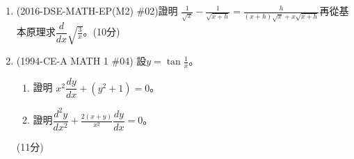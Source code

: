 \documentclass[12pt]{article}
\begin{document}
\begin{enumerate}
            \hrulefill
            
            \hrulefill
            
            \hrulefill

        \pagebreak
        \item (2016-DSE-MATH-EP(M2) \#02)證明 $\displaystyle \frac{1}{\sqrt{x}}-\frac{1}{\sqrt{x+h}}=\frac{h}{(x+h)\sqrt{x}+x\sqrt{x+h}}$再從基本原理求$\displaystyle \dfrac{d}{dx}\sqrt{\frac{3}{x}}$。\hfill(10分)
        
        \hrulefill
            
            \hrulefill
            
            \hrulefill
            
            \hrulefill
            
            \hrulefill
            
            \hrulefill
            
            \hrulefill
            
            \hrulefill
            
            \hrulefill
            
            \hrulefill
            
            \hrulefill
            
            \hrulefill
            
            \hrulefill
            
            \hrulefill

            \hrulefill
            
            \hrulefill
            
            \hrulefill
            
            \hrulefill
            
            \hrulefill
            
            \hrulefill
            
            \hrulefill
            
            \hrulefill
            
            \hrulefill
            
            \hrulefill

        \pagebreak
        \item (1994-CE-A MATH 1 \#04) 設$\displaystyle y=\tan{\frac{1}{x}}$。 \begin{enumerate}
            \item 證明 $x^2\dfrac{dy}{dx}+(y^2+1)=0$。
            \item 證明$\displaystyle\dfrac{d^2y}{dx^2}+\frac{2(x+y)}{x^2}\dfrac{dy}{dx}=0$。
        \end{enumerate}\hfill(11分)
        

\end{enumerate}
\end{document}
